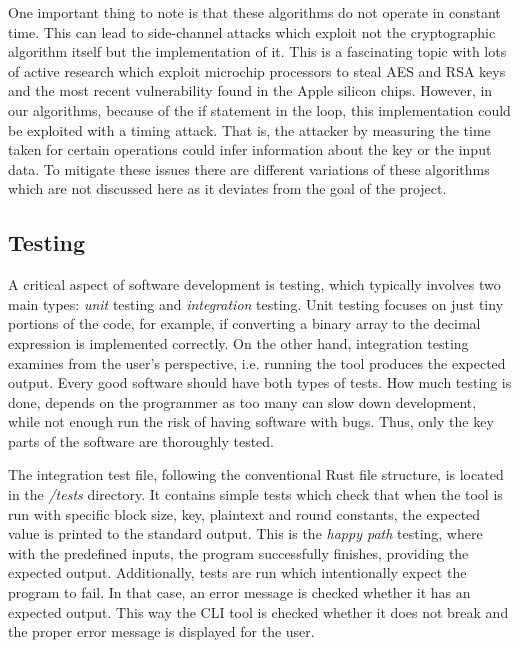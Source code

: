 \documentclass{Resources/UoBLab1}
\theoremstyle{definition}
\begin{document}
One important thing to note is that these algorithms do not operate in constant time. This can lead to side-channel attacks which exploit not the cryptographic algorithm itself but the implementation of it. This is a fascinating topic with lots of active research which exploit microchip processors to steal AES and RSA keys\cite{Spectre} and the most recent vulnerability found in the Apple silicon chips\cite{GoFetch}. However, in our algorithms, because of the if statement in the loop, this implementation could be exploited with a timing attack. That is, the attacker by measuring the time taken for certain operations could infer information about the key or the input data. To mitigate these issues there are different variations of these algorithms which are not discussed here as it deviates from the goal of the project.

\subsection{Testing}
A critical aspect of software development is testing, which typically involves two main types: \textit{unit} testing and \textit{integration} testing. Unit testing focuses on just tiny portions of the code, for example, if converting a binary array to the decimal expression is implemented correctly. On the other hand, integration testing examines from the user's perspective, i.e. running the tool produces the expected output. Every good software should have both types of tests. How much testing is done, depends on the programmer as too many can slow down development, while not enough run the risk of having software with bugs. Thus, only the key parts of the software are thoroughly tested.

The integration test file, following the conventional Rust file structure, is located in the \textit{/tests} directory. It contains simple tests which check that when the tool is run with specific block size, key, plaintext and round constants, the expected value is printed to the standard output. This is the \textit{happy path} testing, where with the predefined inputs, the program successfully finishes, providing the expected output. Additionally, tests are run which intentionally expect the program to fail. In that case, an error message is checked whether it has an expected output. This way the CLI tool is checked whether it does not break and the proper error message is displayed for the user.
\end{document}
